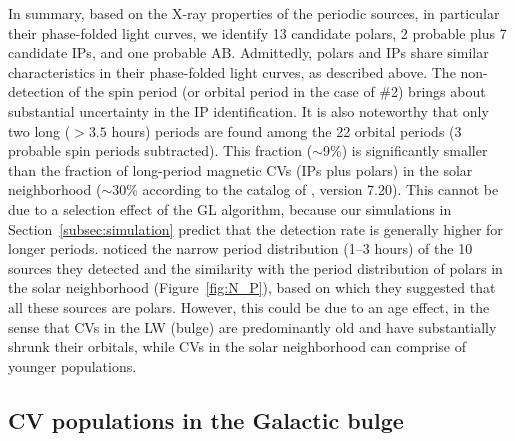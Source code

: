 \documentclass[fleqn,usenatbib]{mnras}
\begin{document}
In summary, based on the X-ray properties of the periodic sources, in particular their phase-folded light curves, we identify 13 candidate polars, 2 probable plus 7 candidate IPs, and one probable AB. 
Admittedly, polars and IPs share similar characteristics in their phase-folded light curves, as described above. The non-detection of the spin period (or orbital period in the case of \#2) brings about substantial uncertainty in the IP identification.
It is also noteworthy that only two long ($>3.5$ hours) periods are found among the 22 orbital periods (3 probable spin periods subtracted). This fraction ($\sim$9\%) is significantly smaller than the fraction of long-period magnetic CVs (IPs plus polars) in the solar neighborhood ($\sim$30\% according to the catalog of \citealp{2003A&A...404..301R}, version 7.20). 
This cannot be due to a selection effect of the GL algorithm, because our simulations in Section~\ref{subsec:simulation} predict that the detection rate is generally higher for longer periods.
\cite{2012ApJ...746..165H} noticed the narrow period distribution (1--3 hours) of the 10 sources they detected and the similarity with the period distribution of polars in the solar neighborhood (Figure~\ref{fig:N_P}), based on which they suggested that all these sources are polars. 
However, this could be due to an age effect, in the sense that CVs in the LW (bulge) are predominantly old and have substantially shrunk their orbitals, while CVs in the solar neighborhood can comprise of younger populations. 

\subsection{CV populations in the Galactic bulge}\label{subsec:population}
\end{document}
